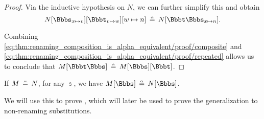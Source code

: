 \begin{proof}
  Via the inductive hypothesis on \( N \), we can further simplify this and obtain
  \begin{equation}\label{eq:thm:renaming_composition_is_alpha_equivalent/proof/repeated}
    N[\Bbbs_{x \mapsto v}][\Bbbt_{v \mapsto w}][w \mapsto n] \aequiv N[\Bbbt\Bbbs_{x \mapsto n}].
  \end{equation}

  Combining \eqref{eq:thm:renaming_composition_is_alpha_equivalent/proof/composite} and \eqref{eq:thm:renaming_composition_is_alpha_equivalent/proof/repeated} allows us to conclude that \( M[\Bbbt\Bbbs] \aequiv M[\Bbbs][\Bbbt] \).
\end{proof}

\begin{lemma}\label{thm:renaming_on_alpha_equivalent_terms}
  If \( M \aequiv N \), for any \hyperref[def:lambda_renaming]{} \( \Bbbs \), we have \( M[\Bbbs] \aequiv N[\Bbbs] \).
\end{lemma}
\begin{comments}
  \item We will use this to prove , which will later be used to prove the generalization  to non-renaming substitutions.
\end{comments}
